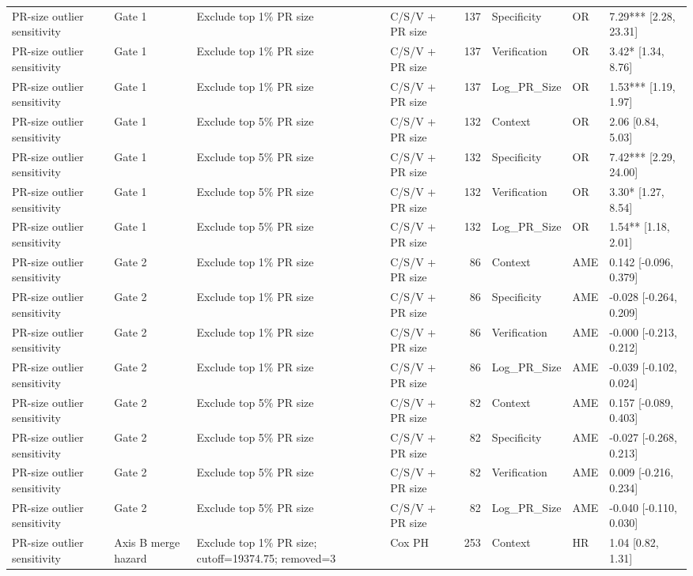\begin{table}
\begin{tabular}{llllrlll}
PR-size outlier sensitivity & Gate 1 & Exclude top 1\% PR size & C/S/V + PR size & 137 & Specificity & OR & 7.29*** [2.28, 23.31] \\
PR-size outlier sensitivity & Gate 1 & Exclude top 1\% PR size & C/S/V + PR size & 137 & Verification & OR & 3.42* [1.34, 8.76] \\
PR-size outlier sensitivity & Gate 1 & Exclude top 1\% PR size & C/S/V + PR size & 137 & Log\_PR\_Size & OR & 1.53*** [1.19, 1.97] \\
PR-size outlier sensitivity & Gate 1 & Exclude top 5\% PR size & C/S/V + PR size & 132 & Context & OR & 2.06 [0.84, 5.03] \\
PR-size outlier sensitivity & Gate 1 & Exclude top 5\% PR size & C/S/V + PR size & 132 & Specificity & OR & 7.42*** [2.29, 24.00] \\
PR-size outlier sensitivity & Gate 1 & Exclude top 5\% PR size & C/S/V + PR size & 132 & Verification & OR & 3.30* [1.27, 8.54] \\
PR-size outlier sensitivity & Gate 1 & Exclude top 5\% PR size & C/S/V + PR size & 132 & Log\_PR\_Size & OR & 1.54** [1.18, 2.01] \\
PR-size outlier sensitivity & Gate 2 & Exclude top 1\% PR size & C/S/V + PR size & 86 & Context & AME & 0.142 [-0.096, 0.379] \\
PR-size outlier sensitivity & Gate 2 & Exclude top 1\% PR size & C/S/V + PR size & 86 & Specificity & AME & -0.028 [-0.264, 0.209] \\
PR-size outlier sensitivity & Gate 2 & Exclude top 1\% PR size & C/S/V + PR size & 86 & Verification & AME & -0.000 [-0.213, 0.212] \\
PR-size outlier sensitivity & Gate 2 & Exclude top 1\% PR size & C/S/V + PR size & 86 & Log\_PR\_Size & AME & -0.039 [-0.102, 0.024] \\
PR-size outlier sensitivity & Gate 2 & Exclude top 5\% PR size & C/S/V + PR size & 82 & Context & AME & 0.157 [-0.089, 0.403] \\
PR-size outlier sensitivity & Gate 2 & Exclude top 5\% PR size & C/S/V + PR size & 82 & Specificity & AME & -0.027 [-0.268, 0.213] \\
PR-size outlier sensitivity & Gate 2 & Exclude top 5\% PR size & C/S/V + PR size & 82 & Verification & AME & 0.009 [-0.216, 0.234] \\
PR-size outlier sensitivity & Gate 2 & Exclude top 5\% PR size & C/S/V + PR size & 82 & Log\_PR\_Size & AME & -0.040 [-0.110, 0.030] \\
PR-size outlier sensitivity & Axis B merge hazard & Exclude top 1\% PR size; cutoff=19374.75; removed=3 & Cox PH & 253 & Context & HR & 1.04 [0.82, 1.31] \\

\end{tabular}
\end{table}

